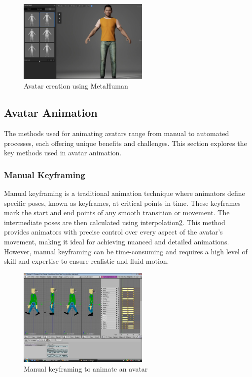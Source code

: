\begin{figure}
  \centering \includegraphics[width = 2.5in]{images/background_work/metahuman_example.png}
  \caption{Avatar creation using MetaHuman}
  \label{fig:metahuman_example}
\end{figure}

\subsection{Avatar Animation}

The methods used for animating avatars range from manual to automated processes, each offering unique benefits and challenges. This section explores the key methods used in avatar animation.

\subsubsection{Manual Keyframing}

Manual keyframing is a traditional animation technique where animators define specific poses, known as keyframes, at critical points in time. These keyframes mark the start and end points of any smooth transition or movement. The intermediate poses are then calculated using interpolation\ref{fig:keyframing}. This method provides animators with precise control over every aspect of the avatar’s movement, making it ideal for achieving nuanced and detailed animations. However, manual keyframing can be time-consuming and requires a high level of skill and expertise to ensure realistic and fluid motion.

\begin{figure}
  \centering \includegraphics[width = 2.5in]{images/background_work/keyframing.png}
  \caption{Manual keyframing to animate an avatar}
  \label{fig:keyframing}
\end{figure}

